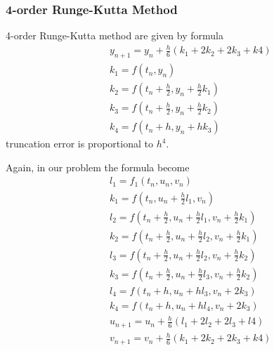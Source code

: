 \documentclass[12pt]{article}
\begin{document}
\subsubsection{4-order Runge-Kutta Method}
4-order Runge-Kutta method are given by formula
\begin{eqnarray}
	&&y_{n+1}=y_n+\frac{h}{6}(k_1+ 2k_2+2k_3+k4)\nonumber\\
	&&k_1=f(t_n,y_n)\nonumber\\
	&&k_2=f(t_n+\frac{h}{2},y_n+\frac{h}{2}k_1)\nonumber\\
	&&k_3=f(t_n+\frac{h}{2},y_n+\frac{h}{2}k_2)\nonumber\\
	&&k_4=f(t_n+h,y_n+hk_3)
\end{eqnarray}
truncation error is proportional to $h^4$.

Again, in our problem the formula become
\begin{eqnarray}
	&&l_1=f_1(t_n,u_n,v_n)\nonumber\\
	&&k_1=f(t_n,u_n+\frac{h}{2}l_1,v_n)\nonumber\\
	&&l_2=f(t_n+\frac{h}{2},u_n+\frac{h}{2}l_1,v_n+\frac{h}{2}k_1)\nonumber\\
	&&k_2=f(t_n+\frac{h}{2},u_n+\frac{h}{2}l_2,v_n+\frac{h}{2}k_1)\nonumber\\
	&&l_3=f(t_n+\frac{h}{2},u_n+\frac{h}{2}l_2,v_n+\frac{h}{2}k_2)\nonumber\\
	&&k_3=f(t_n+\frac{h}{2},u_n+\frac{h}{2}l_3,v_n+\frac{h}{2}k_2)\nonumber\\
	&&l_4=f(t_n+h,u_n+hl_3,v_n+2k_3)\nonumber\\
	&&k_4=f(t_n+h,u_n+hl_4,v_n+2k_3)\nonumber\\
	&&u_{n+1}=u_n+\frac{h}{6}(l_1+ 2l_2+2l_3+l4)\nonumber\\
	&&v_{n+1}=v_n+\frac{h}{6}(k_1+ 2k_2+2k_3+k4)
\end{eqnarray}
\end{document}

